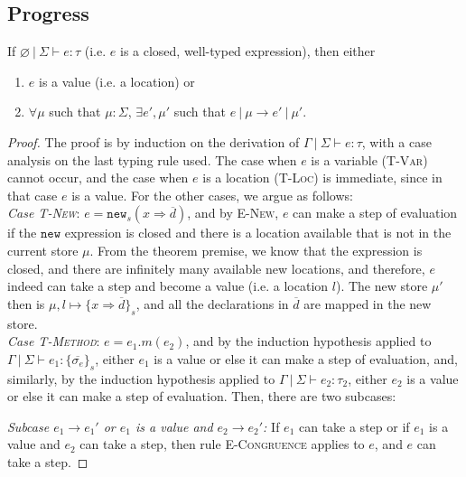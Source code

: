 \documentclass{llncs}
\newcommand{\keywadj}[1]{\mathtt{#1}}
\begin{document}
\subsection{Progress}

\begin{theorem}[Progress]
If $\varnothing~|~\Sigma \vdash e : \tau$ (i.e. $e$ is a closed, well-typed expression), then either
\begin{enumerate}
\item $e$ is a value (i.e. a location) or
\item $\forall \mu$ such that $\mu : \Sigma$,
   $\exists e', \mu'$ such that $e~|~\mu \longrightarrow e'~|~\mu'$.
\end{enumerate}
\end{theorem}
\begin{proof} The proof is by induction on the derivation of $\Gamma~|~\Sigma \vdash e : \tau$, with a case analysis on the last typing rule used. The case when $e$ is a variable (\textsc{T-Var}) cannot occur, and the case when $e$ is a location (\textsc{T-Loc}) is immediate, since in that case $e$ is a value. For the other cases, we argue as follows:
\\

\noindent\textit{Case \textsc{T-New}}:
$e = \keywadj{new}_{s}(x \Rightarrow \overline{d})$, and by \textsc{E-New}, $e$ can make a step of evaluation if the $\keywadj{new}$ expression is closed and there is a location available that is not in the current store $\mu$. From the theorem premise, we know that the expression is closed, and there are infinitely many available new locations, and therefore, $e$ indeed can take a step and become a value (i.e. a location $l$). The new store $\mu'$ then is $\mu, l \mapsto \{ x \Rightarrow \overline{d} \}_{s}$, and all the declarations in $\overline{d}$ are mapped in the new store.
\\

\noindent\textit{Case \textsc{T-Method}}:
$e = e_1.m(e_2)$, and by the induction hypothesis applied to $\Gamma~|~\Sigma \vdash e_1 : \{ \overline{\sigma_e} \}_s$, either $e_1$ is a value or else it can make a step of evaluation, and, similarly, by the induction hypothesis applied to $\Gamma~|~\Sigma \vdash e_2 : \tau_2$, either $e_2$ is a value or else it can make a step of evaluation. Then, there are two subcases:

\textit{Subcase $e_1 \longrightarrow e_1'$ or $e_1$ is a value and $e_2 \longrightarrow e_2'$:} If $e_1$ can take a step or if $e_1$ is a value and $e_2$ can take a step, then rule \textsc{E-Congruence} applies to $e$, and $e$ can take a step.


\end{proof}
\end{document}
